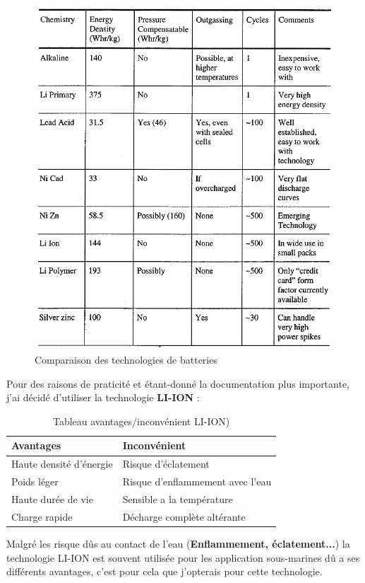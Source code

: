 {{\begin{figure}[h]
    \centering
    \includegraphics[width=.56\textwidth]{Figures/PowerSystemsComparison}
    \caption{Comparaison des technologies de batteries}
    \label{fig:BatteriesComparaisons}
\end{figure}

Pour des raisons de praticité et étant-donné la documentation plus importante, j'ai décidé d'utiliser la technologie \textbf{LI-ION} : \\

\begin{table}[h]
	\centering
	\begin{tabular}{l|l}
		Avantages &  Inconvénient\\
		\hline
		Haute densité d'énergie & Risque d'éclatement \\
		Poids léger & Risque d'enflammement avec l'eau \\ 
		Haute durée de vie & Sensible a la température \\
		Charge rapide & Décharge complète altérante \\
	\end{tabular}
	\caption{Tableau avantages/inconvénient LI-ION)}
\end{table}

\vspace{+8pt}

Malgré les risque dûs au contact de l'eau (\textbf{Enflammement, éclatement...}) la technologie LI-ION est souvent utilisée pour les application sous-marines dû a ses différents avantages, c'est pour cela que j'opterais pour cette technologie. 

}

}

